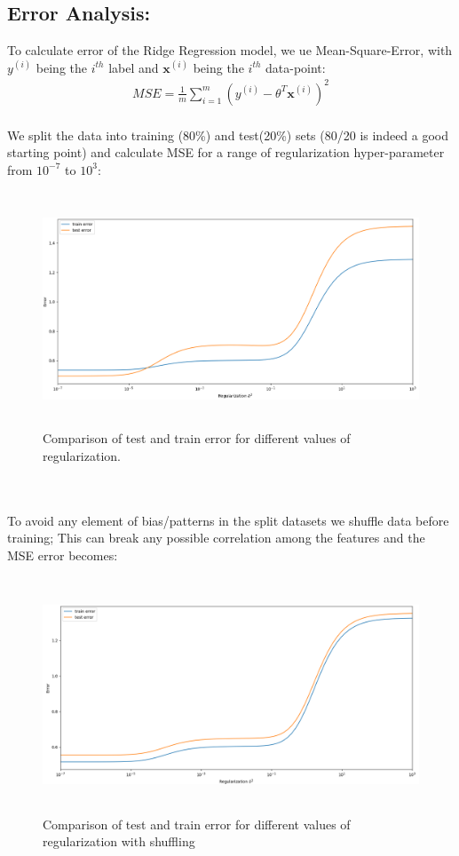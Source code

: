 \documentclass[a4paper,11pt]{article}
\begin{document}
\subsection{\large Error Analysis:}
\noindent
To calculate error of the Ridge Regression model, we ue Mean-Square-Error, with $y^{(i)}$ being the $i^{th}$ label and $\mathbf{x}^{(i)}$ being the $i^{th}$ data-point:
\begin{align*}
MSE = \frac{1}{m}\sum\limits_{i=1}^{m}(y^{(i)}-\theta^T\mathbf{x}^{(i)})^2
\end{align*}
\noindent
\\We split the data into training (80\%) and test(20\%) sets (80/20 is indeed a good starting point) and calculate MSE for a range of regularization hyper-parameter from $10^{-7}$ to $10^{3}$:
\begin{figure}[!htb]
	\centering
	\includegraphics[width=15cm, height=7cm]{plotB_without_shuffle.png}
	\caption{\small Comparison of test and train error for different values of regularization.}
\end{figure}
\\\\To avoid any element of bias/patterns in the split datasets we shuffle data before training; This can break any possible correlation among the features and the MSE error becomes:
\begin{figure}[!htb]
	\centering
	\includegraphics[width=15cm, height=7cm]{plotB.png}
	\caption{\small Comparison of test and train error for different values of regularization with shuffling}
\end{figure}
\end{document}
